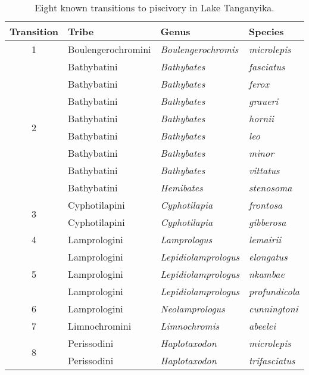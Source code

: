 \begin{table}[]
\centering
\begin{tabular}{clll}
\toprule
\textbf{Transition} & \textbf{Tribe} & \textbf{Genus} & \textbf{Species} \\
\midrule
1 & Boulengerochromini & \textit{Boulengerochromis} & \textit{microlepis} \\
\midrule
\multirow{8}{*}{2} & Bathybatini & \textit{Bathybates} & \textit{fasciatus} \\
 & Bathybatini & \textit{Bathybates} & \textit{ferox} \\
 & Bathybatini & \textit{Bathybates} & \textit{graueri} \\
 & Bathybatini & \textit{Bathybates} & \textit{hornii} \\
 & Bathybatini & \textit{Bathybates} & \textit{leo} \\
 & Bathybatini & \textit{Bathybates} & \textit{minor} \\
 & Bathybatini & \textit{Bathybates} & \textit{vittatus} \\
 & Bathybatini & \textit{Hemibates} & \textit{stenosoma} \\
\midrule
\multirow{2}{*}{3} & Cyphotilapini & \textit{Cyphotilapia} & \textit{frontosa} \\
 & Cyphotilapini & \textit{Cyphotilapia} & \textit{gibberosa} \\
\midrule
4 & Lamprologini & \textit{Lamprologus} & \textit{lemairii} \\
\midrule
\multirow{3}{*}{5} & Lamprologini & \textit{Lepidiolamprologus} & \textit{elongatus} \\
 & Lamprologini & \textit{Lepidiolamprologus} & \textit{nkambae} \\
 & Lamprologini & \textit{Lepidiolamprologus} & \textit{profundicola} \\
\midrule
6 & Lamprologini & \textit{Neolamprologus} & \textit{cunningtoni} \\
\midrule
7 & Limnochromini & \textit{Limnochromis} & \textit{abeelei} \\
\midrule
\multirow{2}{*}{8} & Perissodini & \textit{Haplotaxodon} & \textit{microlepis} \\
 & Perissodini & \textit{Haplotaxodon} & \textit{trifasciatus} \\
\bottomrule
\end{tabular}
\caption{Eight known transitions to piscivory in Lake Tanganyika.}
\label{FJ_table5}
\end{table}